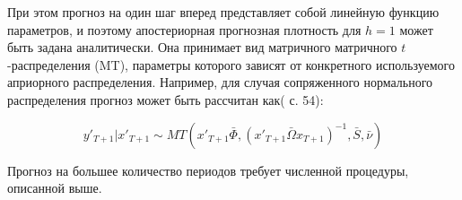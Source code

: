 \documentclass[11pt]{article} %
\begin{document}
При этом прогноз на один шаг вперед представляет собой линейную функцию параметров, и поэтому апостериорная прогнозная плотность для $h=1$ может быть задана аналитически. Она принимает вид матричного матричного $t$-распределения (MT), параметры которого зависят от конкретного используемого априорного распределения.  Например, для случая сопряженного нормального распределения прогноз может быть рассчитан как(\cite{carriero_al_2015} с. 54):

\begin{equation}
y'_{T+1}|x'_{T+1}\sim MT \left(x'_{T+1}\bar\Phi, \left(x'_{T+1}\bar\Omega x_{T+1}\right)^{-1},\bar S,\bar\nu\right)
\end{equation}

Прогноз на большее количество периодов требует численной процедуры, описанной выше.
\end{document}
